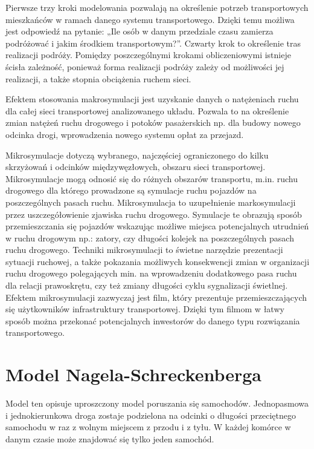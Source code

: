 \documentclass{sprawozdanie-agh}
\begin{document}
\begin{multicols}{2}
		Pierwsze trzy kroki modelowania pozwalają na określenie potrzeb transportowych mieszkańców w ramach danego systemu transportowego. Dzięki temu możliwa jest odpowiedź na pytanie: „Ile osób w danym przedziale czasu zamierza podróżować i jakim środkiem transportowym?”. Czwarty krok to określenie tras realizacji podróży. Pomiędzy poszczególnymi krokami obliczeniowymi istnieje ścisła zależność, ponieważ forma realizacji podróży zależy od możliwości jej realizacji, a także stopnia obciążenia ruchem sieci.

		Efektem stosowania makrosymulacji jest uzyskanie danych o natężeniach ruchu dla całej sieci transportowej analizowanego układu. Pozwala to na określenie zmian natężeń ruchu drogowego i potoków pasażerskich np. dla budowy nowego odcinka drogi, wprowadzenia nowego systemu opłat za przejazd.

		Mikrosymulacje dotyczą wybranego, najczęściej ograniczonego do kilku skrzyżowań i odcinków międzywęzłowych, obszaru sieci transportowej. Mikrosymulacje mogą odnosić się do różnych obszarów transportu, m.in. ruchu drogowego dla którego prowadzone są symulacje ruchu pojazdów na poszczególnych pasach ruchu. Mikrosymulacja to uzupełnienie markosymulacji przez uszczegółowienie zjawiska ruchu drogowego. Symulacje te obrazują sposób przemieszczania się pojazdów wskazując możliwe miejsca potencjalnych utrudnień w ruchu drogowym np.: zatory, czy długości kolejek na poszczególnych pasach ruchu drogowego.
		Techniki mikrosymulacji to świetne narzędzie prezentacji sytuacji ruchowej, a także pokazania możliwych konsekwencji zmian w organizacji ruchu drogowego polegających min. na wprowadzeniu dodatkowego pasa ruchu dla relacji prawoskrętu, czy też zmiany długości cyklu sygnalizacji świetlnej. Efektem mikrosymulacji zazwyczaj jest film, który prezentuje przemieszczających się użytkowników infrastruktury transportowej. Dzięki tym filmom w łatwy sposób można przekonać potencjalnych inwestorów do danego typu rozwiązania transportowego.



		\section{Model Nagela-Schreckenberga}

		Model ten opisuje uproszczony model poruszania się samochodów. Jednopasmowa i jednokierunkowa droga zostaje podzielona na odcinki o długości przeciętnego samochodu w raz z wolnym miejscem z przodu i z tyłu. W każdej komórce w danym czasie może znajdować się tylko jeden samochód.


\end{multicols}
\end{document}
